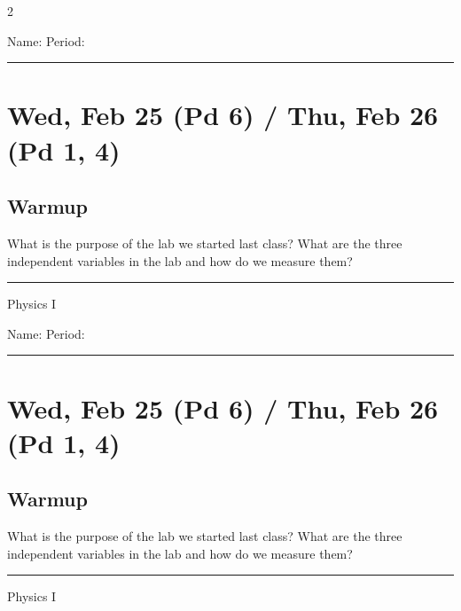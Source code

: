 \documentclass[10pt,landscape]{exam}
\def\todayDate{Wed, Feb 25 (Pd 6) / Thu, Feb 26 (Pd 1, 4)}
\def\content{
\begin{questions}
  \question What is the purpose of the lab we started last class? \vs
  \question What are the three independent variables in the lab and how do we measure them? \vs 
\end{questions}
}
\begin{document}
\pagestyle{empty}

\setlength{\columnsep}{0.8in}
\begin{multicols*}{2}

\noindent  
Name: \hfill Period: \hspace{5em}
\vspace{0.5em}
\hrule

\section*{\todayDate}
\subsection*{Warmup}

\content

\vfill
\hrule
\vspace{0.5em}
\hfill {\sc Physics I}

\columnbreak

\noindent  
Name: \hfill Period: \hspace{5em}
\vspace{0.5em}
\hrule

\section*{\todayDate}
\subsection*{Warmup}

\content

\vfill
\hrule
\vspace{0.5em}
\hfill {\sc Physics I}

\end{multicols*}
\end{document}
